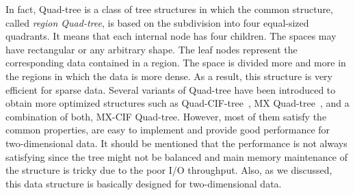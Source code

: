 \documentclass[a4paper,12pt]{article}
\begin{document}
In fact, Quad-tree is a class of tree structures in which the common structure, called \textit{region Quad-tree}, is based on the subdivision into four equal-sized quadrants. It means that each internal node has four children. The spaces may have rectangular or any arbitrary shape. The leaf nodes represent the corresponding data contained in a region. The space is divided more and more in the regions in which the data is more dense. As a result, this structure is very efficient for sparse data.
Several variants of Quad-tree have been introduced to obtain more optimized structures such as Quad-CIF-tree~\cite{quadcif}, MX Quad-tree~\cite{quadmx}, and a combination of both, MX-CIF Quad-tree. However, most of them satisfy the common properties, are easy to implement and provide good performance for two-dimensional data.
It should be mentioned that the performance is not always satisfying since the tree might not be balanced and main memory maintenance of the structure is tricky due to the poor I/O throughput. Also, as we discussed, this data structure is basically designed for two-dimensional data. %
\end{document}
